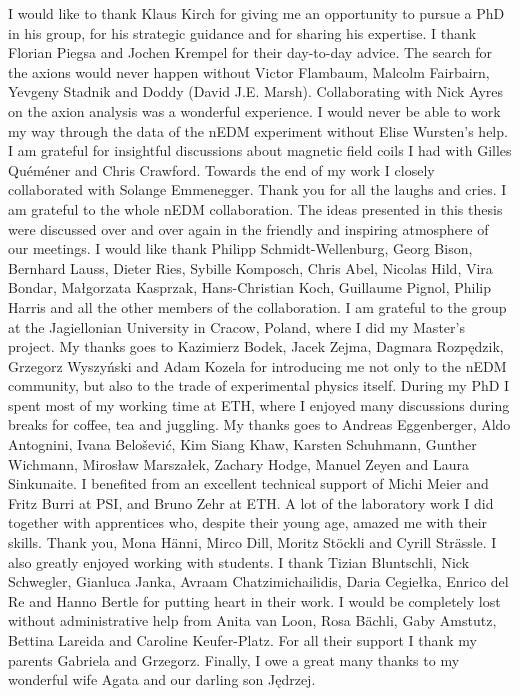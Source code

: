 I would like to thank Klaus Kirch for giving me an opportunity to pursue a PhD in his group, for his strategic guidance and for sharing his expertise.
I thank Florian Piegsa and Jochen Krempel for their day-to-day advice.
The search for the axions would never happen without Victor Flambaum, Malcolm Fairbairn, Yevgeny Stadnik and Doddy (David J.E. Marsh).
Collaborating with Nick Ayres on the axion analysis was a wonderful experience.
I would never be able to work my way through the data of the nEDM experiment without Elise Wursten's help.
I am grateful for insightful discussions about magnetic field coils I had with Gilles Quéméner and Chris Crawford.
Towards the end of my work I closely collaborated with Solange Emmenegger.
Thank you for all the laughs and cries.
I am grateful to the whole nEDM collaboration.
The ideas presented in this thesis were discussed over and over again in the friendly and inspiring atmosphere of our meetings.
I would like thank
Philipp Schmidt-Wellenburg,
Georg Bison,
Bernhard Lauss,
Dieter Ries,
Sybille Komposch,
Chris Abel,
Nicolas Hild,
Vira Bondar,
Małgorzata Kasprzak,
Hans-Christian Koch,
Guillaume Pignol,
Philip Harris
and all the other members of the collaboration.
I am grateful to the group at the Jagiellonian University in Cracow, Poland, where I did my Master's project.
My thanks goes to
Kazimierz Bodek,
Jacek Zejma,
Dagmara Rozpędzik,
Grzegorz Wyszyński and
Adam Kozela
for introducing me not only to the nEDM community, but also to the trade of experimental physics itself.
During my PhD I spent most of my working time at ETH, where I enjoyed many discussions during breaks for coffee, tea and juggling.
My thanks goes to
Andreas Eggenberger,
Aldo Antognini,
Ivana Belo\v{s}ević,
Kim Siang Khaw,
Karsten Schuhmann,
Gunther Wichmann,
Mirosław Marszałek,
Zachary Hodge,
Manuel Zeyen and
Laura Sinkunaite.
I benefited from an excellent technical support of Michi Meier and Fritz Burri at PSI, and Bruno Zehr at ETH\@.
A lot of the laboratory work I did together with apprentices who, despite their young age, amazed me with their skills.
Thank you,
Mona Hänni,
Mirco Dill,
Moritz Stöckli and
Cyrill Strässle.
I also greatly enjoyed working with students.
I thank
Tizian Bluntschli,
Nick Schwegler,
Gianluca Janka,
Avraam Chatzimichailidis,
Daria Cegiełka,
Enrico del Re and
Hanno Bertle for putting heart in their work.
I would be completely lost without administrative help from Anita van Loon, Rosa Bächli,
Gaby Amstutz, Bettina Lareida and Caroline Keufer-Platz.
For all their support I thank my parents Gabriela and Grzegorz.
Finally, I owe a great many thanks to my wonderful wife Agata and our darling son Jędrzej.

